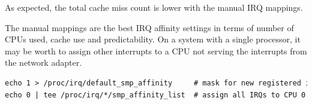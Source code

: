 As expected, the total cache miss count is lower with the manual IRQ mappings.

The manual mappings are the best IRQ affinity settings in terms of number of CPUs used,
cache use and predictability.
On a system with a single processor, it may be worth to assign other interrupts
to a CPU not serving the interrupts from the network adapter.
\begin{lstlisting}[language=TeX]
echo 1 > /proc/irq/default_smp_affinity     # mask for new registered irqs
echo 0 | tee /proc/irq/*/smp_affinity_list  # assign all IRQs to CPU 0
\end{lstlisting}
